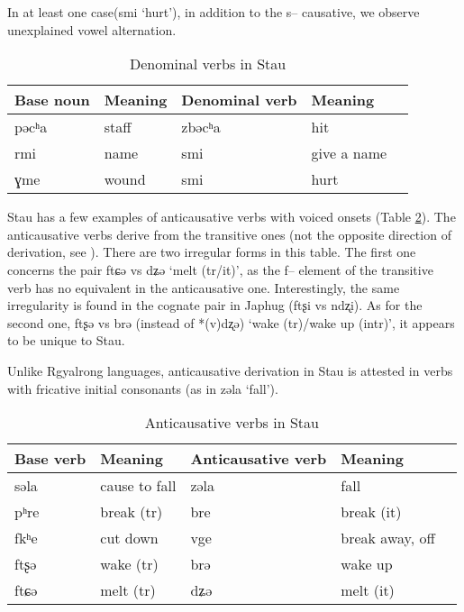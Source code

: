 \documentclass[oneside,a4paper,11pt]{article}
\newcommand{\ipa}[1]{{\phon #1}} %
\begin{document}
In at least one case(\ipa{smi} `hurt'), in addition to the \ipa{s--} causative, we observe unexplained vowel alternation. 
 
 \begin{table}[H]
 \caption{Denominal verbs in Stau} \label{tab:denominal} \centering 
\begin{tabular}{lllll}
\toprule
Base noun & Meaning & Denominal verb & Meaning \\
\midrule
\ipa{pəcʰa} & staff&\ipa{zbəcʰa} & hit \\
\ipa{rmi} &name &\ipa{smi} &give a name \\
\ipa{ɣme} &wound &\ipa{smi} & hurt \\
\bottomrule
\end{tabular}
\end{table}
 
 
 Stau has a few examples of anticausative verbs with voiced onsets (Table \ref{tab:anticausative}). The anticausative verbs derive from the transitive ones (not the opposite direction of derivation, see \citealt{jacques12demotion}). There are two irregular forms in this table. The first one concerns the pair \ipa{ftɕə} vs \ipa{dʑə} `melt (tr/it)', as the \ipa{f--} element of the transitive verb has no equivalent in the anticausative one. Interestingly, the same irregularity is found in the cognate pair in Japhug (\ipa{ftʂi} vs \ipa{ndʐi}). As for the second one, \ipa{ftʂə} vs \ipa{brə} (instead of *\ipa{(v)dʐə}) `wake (tr)/wake up (intr)', it appears to be unique to Stau.
 
Unlike Rgyalrong languages, anticausative derivation in Stau is attested in verbs with fricative initial consonants (as in \ipa{zəla}  `fall').
 
  \begin{table}[H]
 \caption{Anticausative verbs in Stau} \label{tab:anticausative} \centering 
\begin{tabular}{lllll}
\toprule
Base verb & Meaning & Anticausative verb & Meaning \\
\midrule
 \ipa{səla} &cause to fall & \ipa{zəla}  & fall \\
\ipa{pʰre}   &break (tr) &\ipa{bre}   & break (it) \\
  \ipa{fkʰe} & cut down & \ipa{vge} & break away, off \\
\ipa{ftʂə}& wake (tr) & \ipa{brə}& wake up\\
\ipa{ftɕə} &melt (tr) &\ipa{dʑə} &melt (it)\\
 \bottomrule
\end{tabular}
\end{table}
 
\end{document}
